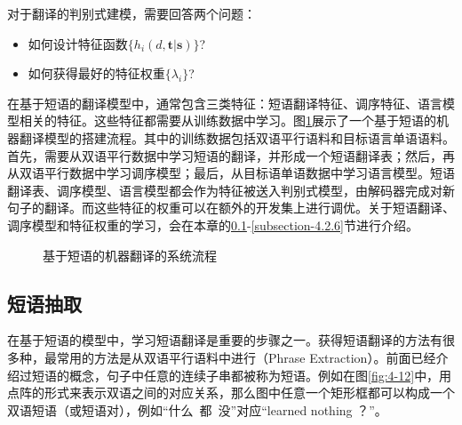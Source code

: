 \parinterval 对于翻译的判别式建模，需要回答两个问题：

\begin{itemize}
\vspace{0.5em}
\item 如何设计特征函数$\{h_i(d,\mathbf{t}|\mathbf{s})\}$?
\vspace{0.5em}
\item 如何获得最好的特征权重$\{\lambda_i\}$?
\vspace{0.5em}
\end{itemize}

\parinterval 在基于短语的翻译模型中，通常包含三类特征：短语翻译特征、调序特征、语言模型相关的特征。这些特征都需要从训练数据中学习。图\ref{fig:4-11}展示了一个基于短语的机器翻译模型的搭建流程。其中的训练数据包括双语平行语料和目标语言单语语料。首先，需要从双语平行数据中学习短语的翻译，并形成一个短语翻译表；然后，再从双语平行数据中学习调序模型；最后，从目标语单语数据中学习语言模型。短语翻译表、调序模型、语言模型都会作为特征被送入判别式模型，由解码器完成对新句子的翻译。而这些特征的权重可以在额外的开发集上进行调优。关于短语翻译、调序模型和特征权重的学习，会在本章的\ref{subsection-4.2.3}-\ref{subsection-4.2.6}节进行介绍。

\begin{figure}[htp]
\centering

\caption{基于短语的机器翻译的系统流程}
\label{fig:4-11}
\end{figure}


\subsection{短语抽取}\label{subsection-4.2.3}

\parinterval 在基于短语的模型中，学习短语翻译是重要的步骤之一。获得短语翻译的方法有很多种，最常用的方法是从双语平行语料中进行{\small{}}（Phrase Extraction）。前面已经介绍过短语的概念，句子中任意的连续子串都被称为短语。例如在图\ref{fig:4-12}中，用点阵的形式来表示双语之间的对应关系，那么图中任意一个矩形框都可以构成一个双语短语（或短语对），例如``什么\ 都\ 没''对应``learned nothing ？''。

